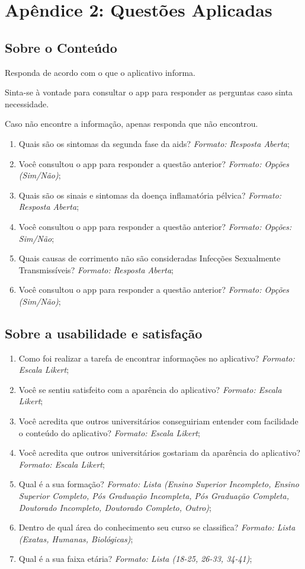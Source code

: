 \documentclass[12pt]{article}
\begin{document}
\section{Apêndice 2: Questões Aplicadas}
\label{ap:questoes}

\subsection{Sobre o Conteúdo}

Responda de acordo com o que o aplicativo informa. 

Sinta-se à vontade para consultar o app para responder as perguntas caso sinta necessidade. 

Caso não encontre a informação, apenas responda que não encontrou.

\begin{enumerate}
	\item Quais são os sintomas da segunda fase da aids? \textit{Formato: Resposta Aberta};
	\item Você consultou o app para responder a questão anterior? \textit{Formato: Opções (Sim/Não)};
	\item Quais são os sinais e sintomas da doença inflamatória pélvica? \textit{Formato: Resposta Aberta};
	\item Você consultou o app para responder a questão anterior? \textit{Formato: Opções: Sim/Não};
	\item Quais causas de corrimento não são consideradas Infecções Sexualmente Transmissíveis? \textit{Formato: Resposta Aberta};
	\item Você consultou o app para responder a questão anterior? \textit{Formato: Opções (Sim/Não)};
\end{enumerate}

\subsection{Sobre a usabilidade e satisfação}

\begin{enumerate}
	\item Como foi realizar a tarefa de encontrar informações no aplicativo? \textit{Formato: Escala Likert};
	\item Você se sentiu satisfeito com a aparência do aplicativo? \textit{Formato: Escala Likert};
	\item Você acredita que outros universitários conseguiriam entender com facilidade o conteúdo do aplicativo? \textit{Formato: Escala Likert};
	\item Você acredita que outros universitários gostariam da aparência do aplicativo? \textit{Formato: Escala Likert};
	\item Qual é a sua formação? \textit{Formato: Lista (Ensino Superior Incompleto, Ensino Superior Completo, Pós Graduação Incompleta, Pós Graduação Completa, Doutorado Incompleto, Doutorado Completo, Outro)};
	\item Dentro de qual área do conhecimento seu curso se classifica? \textit{Formato: Lista (Exatas, Humanas, Biológicas)};
	\item Qual é a sua faixa etária? \textit{Formato: Lista (18-25, 26-33, 34-41)};
\end{enumerate}
\end{document}
